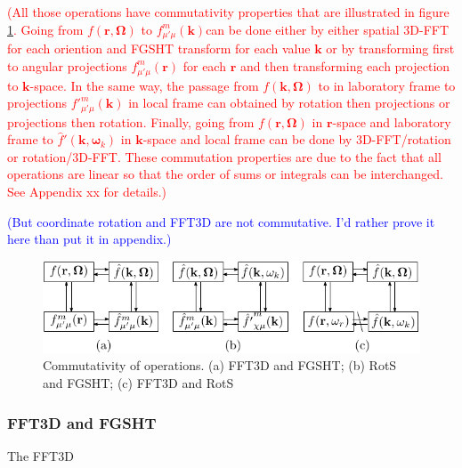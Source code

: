 \textcolor{red}{(All those operations have commutativity properties
that are illustrated in figure \ref{fig:Commutativity-of-operations}.
Going from $f(\mathbf{r},\mathbf{\Omega})$ to $f_{\mu'\mu}^{m}(\mathbf{k})$can
be done either by either spatial 3D-FFT for each oriention and FGSHT
transform for each value $\boldsymbol{k}$ or by transforming first
to angular projections $f_{\mu'\mu}^{m}(\mathbf{r})$ for each $\mathbf{r}$
and then transforming each projection to $\boldsymbol{k}$-space.
In the same way, the passage from $f(\mathbf{k},\mathbf{\Omega})$
to in laboratory frame to projections $f'_{\mu'\mu}^{m}(\mathbf{k})$
in local frame can obtained by rotation then projections or projections
then rotation. Finally, going from $f(\mathbf{r},\mathbf{\Omega})$
in $\mathbf{r}$-space and laboratory frame to $\hat{f}'(\mathbf{k},\boldsymbol{\omega}_{k})$
in $\mathbf{k}$-space and local frame can be done by 3D-FFT/rotation
or rotation/3D-FFT. These commutation properties are due to the fact
that all operations are linear so that the order of sums or integrals
can be interchanged. See Appendix xx for details.)}

\textcolor{blue}{(But coordinate rotation and FFT3D are not commutative.
I'd rather prove it here than put it in appendix.)}

\begin{figure}[h]
\begin{centering}
\includegraphics{_figure/algorithms_commutativity}
\par\end{centering}
\caption[Commutativity of operations]{Commutativity of operations. (a) FFT3D and FGSHT; (b) RotS and FGSHT;
(c) FFT3D and RotS\label{fig:Commutativity-of-operations}}
\end{figure}


\subsubsection{FFT3D and FGSHT}

The FFT3D

